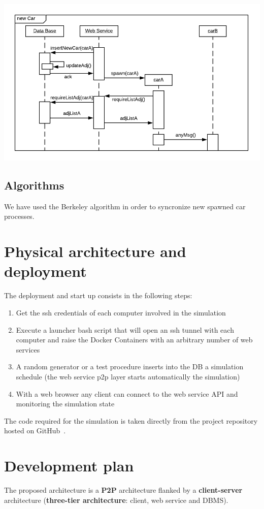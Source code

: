 \begin{center}
    \includegraphics[scale=0.8]{assets/ds2019_1.png}
\end{center}


\subsection{Algorithms}

We have used the Berkeley algorithm in order to syncronize new spawned car processes.


\section{Physical architecture and deployment}

The deployment and start up consists in the following steps:
\begin{enumerate}
    \item Get the ssh credentials of each computer involved in the simulation
    \item Execute a launcher bash script that will open an ssh tunnel with each computer and 
        raise the Docker Containers with an arbitrary number of web services 
    \item A random generator or a test procedure inserts into the DB a simulation schedule
        (the web service p2p layer starts automatically the simulation)
    \item With a web browser any client can connect to the web service API and monitoring 
        the simulation state   
\end{enumerate}

The code required for the simulation is taken directly from the project repository hosted on 
GitHub~\cite{2}.


\section{Development plan}

The proposed architecture is a \textbf{P2P} architecture flanked by a 
\textbf{client-server} architecture (\textbf{three-tier architecture}: client, web service and DBMS).

